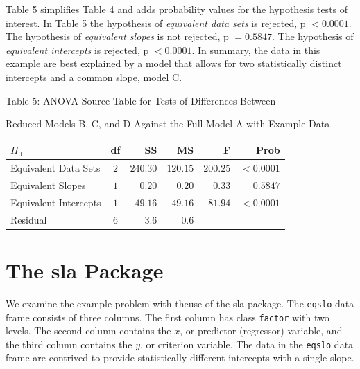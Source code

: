 \documentclass[11pt, oneside]{article}   	%
\begin{document}
Table 5 simplifies Table 4 and adds probability values for the hypothesis tests of interest.  In Table 5 the hypothesis of \emph{equivalent data sets} is rejected, p $ < 0.0001  $.  The hypothesis of \emph{ equivalent slopes} is not rejected, p $ = 0.5847 $.  The hypothesis of \emph{equivalent intercepts} is rejected, p $ < 0.0001  $.  In summary, the data in this example are best explained by a model that allows for two statistically distinct intercepts and a common slope, model C. 
\bigskip    

\vspace{2 mm}
 
 \vspace{8 mm}

 \begin{table} [h]
\centerline{Table 5:  ANOVA Source Table for Tests of Differences Between} 
\centerline{Reduced Models B, C, and D Against the Full Model A  with Example Data} 
\centering
\bigskip
\begin{tabular}{lcrrrr}
\hline
$ H_{0} $ &   df & SS     & MS     & F  &  Prob \\ 
\hline
\hline
Equivalent Data Sets     &    $ 2  $    &    $  240.30 $ &  $  120.15 $    &    $ 200.25 $  &  $ < 0.0001 $  \\
Equivalent Slopes     &    $  1  $    &    $   0.20 $ &  $  0.20  $    &    $  0.33  $  & $ 0.5847  $ \\
Equivalent Intercepts       &    $ 1  $    &    $  49.16 $ &  $  49.16 $    &    $ 81.94 $  & $ <0.0001 $ \\
\hline
Residual  &  6   &  3.6 &  0.6   &       &      \\  
\hline
\end{tabular} 
\end{table}
\bigskip



\vspace{2 mm}

\section{ The sla Package}
We examine the example problem with theuse of the sla package.  The \texttt{eqslo} data frame consists of three columns.  The first column has class \texttt{factor} with two levels.  The second column contains the $ x  $, or predictor (regressor) variable, and the third column contains the $  y $, or criterion variable. The data in the \texttt{eqslo} data frame are contrived to provide statistically different intercepts with a single slope. 
\vspace{ 3 mm}
\end{document}
